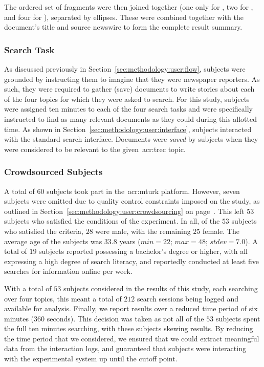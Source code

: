 The ordered set of fragments were then joined together (one only for , two for , and four for ), separated by ellipses. These were combined together with the document's title and source newswire to form the complete result summary.

\subsubsection{Search Task}
As discussed previously in Section~\ref{sec:methodology:user:flow}, subjects were grounded by instructing them to imagine that they were newspaper reporters. As such, they were required to gather (save) documents to write stories about each of the four topics for which they were asked to search. For this study, subjects were assigned ten minutes to each of the four search tasks and were specifically instructed to find as many relevant documents as they could during this allotted time. As shown in Section~\ref{sec:methodology:user:interface}, subjects interacted with the standard search interface. Documents were \emph{saved} by subjects when they were considered to be relevant to the given~\gls{acr:trec} topic.

\subsubsection{Crowdsourced Subjects}\label{sec:snippets:method:subjects}
A total of $60$ subjects took part in the~\gls{acr:mturk} platform. However, seven subjects were omitted due to quality control constraints imposed on the study, as outlined in Section~\ref{sec:methodology:user:crowdsourcing} on page~\pageref{sec:methodology:user:crowdsourcing}. This left $53$ subjects who satisfied the conditions of the experiment. In all, of the $53$ subjects who satisfied the criteria, $28$ were male, with the remaining $25$ female. The average age of the subjects was $33.8$ years ($min=22$; $max=48$; $stdev=7.0$). A total of $19$ subjects reported possessing a bachelor's degree or higher, with all expressing a high degree of search literacy, and reportedly conducted at least five searches for information online per week.

With a total of $53$ subjects considered in the results of this study, each searching over four topics, this meant a total of $212$ search sessions being logged and available for analysis. Finally, we report results over a reduced time period of six minutes ($360$ seconds). This decision was taken as not all of the $53$ subjects spent the full ten minutes searching, with these subjects skewing results. By reducing the time period that we considered, we ensured that we could extract meaningful data from the interaction logs, and guaranteed that subjects were interacting with the experimental system up until the cutoff point.

